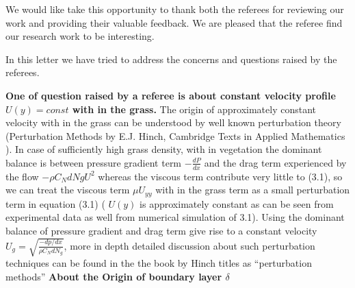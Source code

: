 \documentclass[a4paper,12pt]{article}
\begin{document}



 


We would like take this opportunity to thank both the referees for reviewing our work and providing their valuable feedback. We are pleased that the referee find 
our research work to be interesting.


In this letter we have tried to address the concerns and questions raised by the referees.

\textbf{One of question raised by a referee is about constant velocity profile $U(y)=const$ with in the grass.} 
\newline
The origin of approximately constant velocity with in the grass 
can be understood by well known perturbation theory (Perturbation Methods by E.J. Hinch, Cambridge Texts in Applied Mathematics ). In case of sufficiently high grass density, 
with in vegetation the dominant balance is between pressure gradient term $-\frac{dP}{dx}$ and the drag term experienced by the flow $-\rho C_N dNg U^2$ whereas the viscous term contribute very little 
to (3.1), so we can treat the viscous term $\mu U_{yy}$ with in the grass term as a small perturbation term in equation (3.1) ( $U(y)$ is approximately constant as can be seen from experimental data as well from
numerical simulation of 3.1). Using the dominant balance of pressure gradient and drag term 
give rise to a constant velocity $U_g = \sqrt{\frac{-dp/dx}{\rho C_N d N_g}}$, more in depth detailed discussion about such perturbation techniques can be found in the the book by Hinch titles as ``perturbation
methods''
\newline
\textbf{ About the Origin of boundary layer $\delta$}
\end{document}
